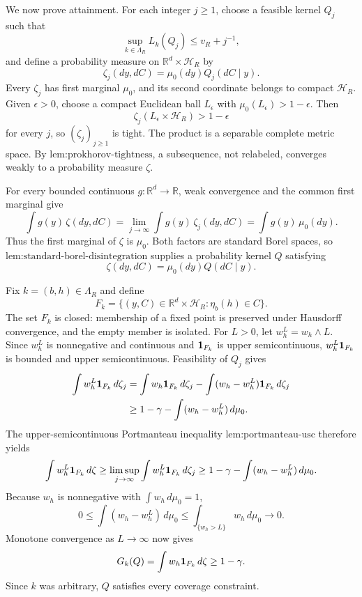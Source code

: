 We now prove attainment.  For each integer \(j\ge1\), choose a feasible kernel \(Q_j\) such that
\[
\sup_{k\in\Lambda_R}L_k(Q_j)\le v_R+j^{-1},
\]
and define a probability measure on \(\mathbb R^d\times\mathcal H_R\) by
\[
\zeta_j(dy,dC)=\mu_0(dy)Q_j(dC\mid y).
\]
Every \(\zeta_j\) has first marginal \(\mu_0\), and its second coordinate belongs to compact \(\mathcal H_R\).  Given \(\epsilon>0\), choose a compact Euclidean ball \(L_\epsilon\) with \(\mu_0(L_\epsilon)>1-\epsilon\).  Then
\[
\zeta_j(L_\epsilon\times\mathcal H_R)>1-\epsilon
\]
for every \(j\), so \((\zeta_j)_{j\ge1}\) is tight.  The product is a separable complete metric space.  By \(\text{lem:prokhorov-tightness}\), a subsequence, not relabeled, converges weakly to a probability measure \(\zeta\).

For every bounded continuous \(g:\mathbb R^d\to\mathbb R\), weak convergence and the common first marginal give
\[
\int g(y)\,\zeta(dy,dC)
=\lim_{j\to\infty}\int g(y)\,\zeta_j(dy,dC)
=\int g(y)\,\mu_0(dy).
\]
Thus the first marginal of \(\zeta\) is \(\mu_0\).  Both factors are standard Borel spaces, so \(\text{lem:standard-borel-disintegration}\) supplies a probability kernel \(Q\) satisfying
\[
\zeta(dy,dC)=\mu_0(dy)Q(dC\mid y).
\]

Fix \(k=(b,h)\in\Lambda_R\) and define
\[
F_k=\{(y,C)\in\mathbb R^d\times\mathcal H_R:\eta_b(h)\in C\}.
\]
The set \(F_k\) is closed: membership of a fixed point is preserved under Hausdorff convergence, and the empty member is isolated.  For \(L>0\), let \(w_h^L=w_h\wedge L\).  Since \(w_h^L\) is nonnegative and continuous and \({\bf1}_{F_k}\) is upper semicontinuous, \(w_h^L{\bf1}_{F_k}\) is bounded and upper semicontinuous.  Feasibility of \(Q_j\) gives
\[
\begin{aligned}
\int w_h^L{\bf1}_{F_k}\,d\zeta_j
&=\int w_h{\bf1}_{F_k}\,d\zeta_j
  -\int(w_h-w_h^L){\bf1}_{F_k}\,d\zeta_j\\
&\ge1-\gamma-\int(w_h-w_h^L)\,d\mu_0.
\end{aligned}
\]
The upper-semicontinuous Portmanteau inequality \(\text{lem:portmanteau-usc}\) therefore yields
\[
\int w_h^L{\bf1}_{F_k}\,d\zeta
\ge\limsup_{j\to\infty}\int w_h^L{\bf1}_{F_k}\,d\zeta_j
\ge1-\gamma-\int(w_h-w_h^L)\,d\mu_0.
\]
Because \(w_h\) is nonnegative with \(\int w_h\,d\mu_0=1\),
\[
0\le\int(w_h-w_h^L)\,d\mu_0
\le\int_{\{w_h>L\}}w_h\,d\mu_0\longrightarrow0.
\]
Monotone convergence as \(L\to\infty\) now gives
\[
G_k(Q)=\int w_h{\bf1}_{F_k}\,d\zeta\ge1-\gamma.
\]
Since \(k\) was arbitrary, \(Q\) satisfies every coverage constraint.

